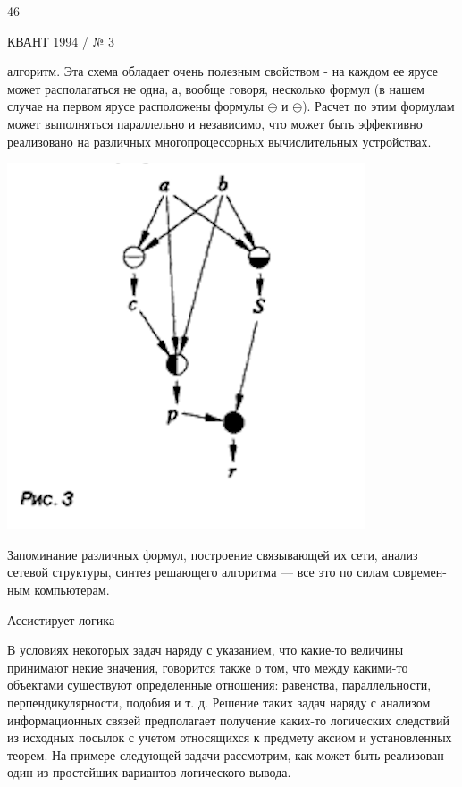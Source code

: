 
\begin{flushleft}
46
\end{flushleft}
\begin{center}
КВАНТ 1994 / № 3
\end{center}



\small
\begin{minipage}{0.3\textwidth}

алгоритм. Эта схема обладает очень полезным свойством - на каждом ее ярусе может располагаться не одна, а, вообще говоря, несколько формул (в нашем случае на первом ярусе расположены формулы $\ominus$ и $\ominus$). Расчет по этим формулам может выполняться параллельно и независимо, что может быть эффективно реализовано на различных многопроцессорных вычислительных устройствах.


\includegraphics[scale=0.8]{images/Screenshot 2022-12-05 at 13.15.30.png}

\hspace{0.1cm} Запоминание различных формул, построение связывающей их сети, анализ
сетевой структуры, синтез решающего
алгоритма — все это по силам современ-
ным компьютерам.

\vspace{0.5cm}
\hline
\vspace{0.09cm}
\large{
Ассистирует логика 
}
\hline
\vspace{0.2cm}

\small
\hspace{0.1cm} В условиях некоторых задач наряду с
указанием, что какие-то величины принимают некие значения, говорится также о
том, что между какими-то объектами
существуют определенные отношения:
равенства, параллельности, перпендикулярности, подобия и т. д. Решение таких
задач наряду с анализом информационных связей предполагает получение каких-то логических следствий из исходных 
посылок с учетом относящихся к предмету 
аксиом и установленных теорем. На
примере следующей задачи рассмотрим,
как может быть реализован один из простейших вариантов логического вывода.



\end{minipage}
